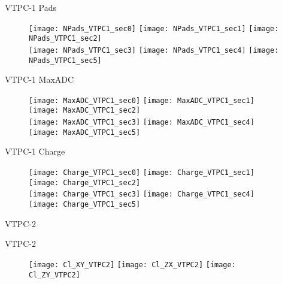 \documentclass[11pt]{beamer}
\begin{document}
\begin{frame}{VTPC-1 Pads}
\begin{figure}
\centering
\texttt{[image: NPads\_VTPC1\_sec0]}
\texttt{[image: NPads\_VTPC1\_sec1]}
\texttt{[image: NPads\_VTPC1\_sec2]}\\
\texttt{[image: NPads\_VTPC1\_sec3]}
\texttt{[image: NPads\_VTPC1\_sec4]}
\texttt{[image: NPads\_VTPC1\_sec5]}
\end{figure}
\end{frame}

\begin{frame}{VTPC-1 MaxADC}
\begin{figure}
\centering
\texttt{[image: MaxADC\_VTPC1\_sec0]}
\texttt{[image: MaxADC\_VTPC1\_sec1]}
\texttt{[image: MaxADC\_VTPC1\_sec2]}\\
\texttt{[image: MaxADC\_VTPC1\_sec3]}
\texttt{[image: MaxADC\_VTPC1\_sec4]}
\texttt{[image: MaxADC\_VTPC1\_sec5]}
\end{figure}
\end{frame}

\begin{frame}{VTPC-1 Charge}
\begin{figure}
\centering
\texttt{[image: Charge\_VTPC1\_sec0]}
\texttt{[image: Charge\_VTPC1\_sec1]}
\texttt{[image: Charge\_VTPC1\_sec2]}\\
\texttt{[image: Charge\_VTPC1\_sec3]}
\texttt{[image: Charge\_VTPC1\_sec4]}
\texttt{[image: Charge\_VTPC1\_sec5]}
\end{figure}
\end{frame}

\begin{frame}
\centering
\Huge
VTPC-2
\end{frame}

\begin{frame}{VTPC-2}
\begin{figure}
\centering
\texttt{[image: Cl\_XY\_VTPC2]}
\texttt{[image: Cl\_ZX\_VTPC2]}
\texttt{[image: Cl\_ZY\_VTPC2]}
\end{figure}
\end{frame}
\end{document}
